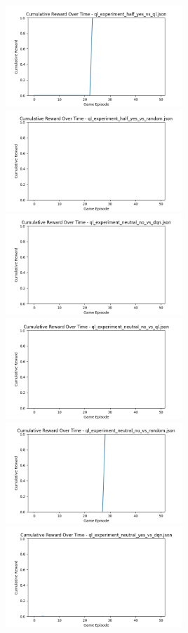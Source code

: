 \includegraphics[width=0.5\textwidth]{images/cumulative_reward_ql_experiment_half_yes_vs_ql.png} 
\includegraphics[width=0.5\textwidth]{images/cumulative_reward_ql_experiment_half_yes_vs_random.png} 
\includegraphics[width=0.5\textwidth]{images/cumulative_reward_ql_experiment_neutral_no_vs_dqn.png} 
\includegraphics[width=0.5\textwidth]{images/cumulative_reward_ql_experiment_neutral_no_vs_ql.png} 
\includegraphics[width=0.5\textwidth]{images/cumulative_reward_ql_experiment_neutral_no_vs_random.png} 
\includegraphics[width=0.5\textwidth]{images/cumulative_reward_ql_experiment_neutral_yes_vs_dqn.png} 
